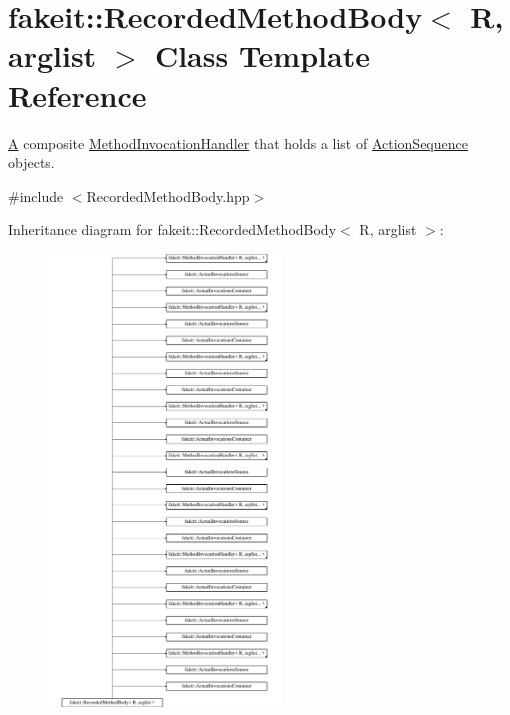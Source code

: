 \hypertarget{classfakeit_1_1RecordedMethodBody}{}\section{fakeit\+::Recorded\+Method\+Body$<$ R, arglist $>$ Class Template Reference}
\label{classfakeit_1_1RecordedMethodBody}


\mbox{\hyperlink{structA}{A}} composite \mbox{\hyperlink{structfakeit_1_1MethodInvocationHandler}{Method\+Invocation\+Handler}} that holds a list of \mbox{\hyperlink{structfakeit_1_1ActionSequence}{Action\+Sequence}} objects.  




{\ttfamily \#include $<$Recorded\+Method\+Body.\+hpp$>$}

Inheritance diagram for fakeit\+::Recorded\+Method\+Body$<$ R, arglist $>$\+:\begin{figure}[H]
\begin{center}
\leavevmode
\includegraphics[height=12.000000cm]{classfakeit_1_1RecordedMethodBody}
\end{center}
\end{figure}
